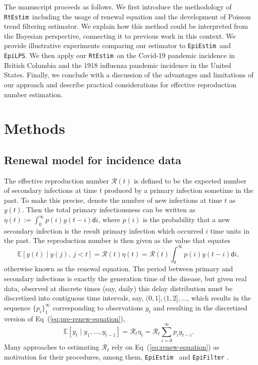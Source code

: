 \documentclass[10pt,letterpaper]{article}
\def\RtEstim{\texttt{RtEstim}}
\def\EpiEstim{\texttt{EpiEstim}}
\def\EpiLPS{\texttt{EpiLPS}}
\def\bbE{\mathbb{E}}
\def\calR{\mathcal{R}}
\def\diff{\mathsf{d}}
\newcommand{\citep}[1]{\cite{#1}}
\renewcommand{\eqref}[1]{Eq~(\ref{#1})}
\begin{document}
The manuscript proceeds as follows. We first introduce the methodology of
\RtEstim\ including the usage of renewal equation and the development of Poisson
trend filtering estimator. We explain how this method could be interpreted from
the Bayesian perspective, connecting it to previous work in this context. We
provide illustrative experiments comparing our estimator to \EpiEstim\ and
\EpiLPS. We then apply our \RtEstim\ on the Covid-19 pandemic incidence in
British Columbia and the 1918 influenza pandemic incidence in the United States. 
Finally, we conclude with a discussion of the advantages and limitations of our 
approach and describe practical considerations for effective reproduction number
estimation.


\section{Methods}

\subsection{Renewal model for incidence data} 

The effective reproduction number $\calR(t)$
is defined to be the expected number of secondary infections at time $t$
produced by a primary infection sometime in the past.
To make this precise, denote the number of new infections at time $t$ 
as $y(t)$. Then the total primary infectiousness can be written as 
$\eta(t) := \int_0^{\infty} p(i) y(t-i) \diff i$, 
where $p(i)$ is the probability that a new secondary infection is the result
primary infection which occurred $i$ time units in the past. 
The reproduction number is then given as the value that equates
\begin{equation} \label{eq:pre-renew-equation}
  \bbE[y(t) \mid y(j),\ j<t]=\calR(t)\eta(t)=\calR(t)\int_0^\infty p(i)y(t-i)\diff i,
\end{equation}
otherwise known as the renewal equation. The period between primary and secondary
infections is exactly the generation time of the disease, but given real data,
observed at discrete times (say, daily) this delay distribution must be discretized
into contiguous time intervals,
say, $(0,1], (1,2], \dots$, which results in the sequence $\{p_i\}_1^\infty$
corresponding to observations $y_t$ and resulting in the
discretized version of \eqref{eq:pre-renew-equation},
\begin{equation} \label{eq:renew-equation}
  \bbE[y_t \mid y_1,\ldots,y_{t-1}]=\calR_t\eta_t=\calR_t\sum_{i = 0}^\infty p_i y_{t-i}.
\end{equation}
Many approaches to estimating $\calR_t$ rely on \eqref{eq:renew-equation} as
motivation for their procedures, among them, \EpiEstim\ \citep{cori2013new} 
and \texttt{EpiFilter} \citep{parag2021improved}. 
\end{document}
